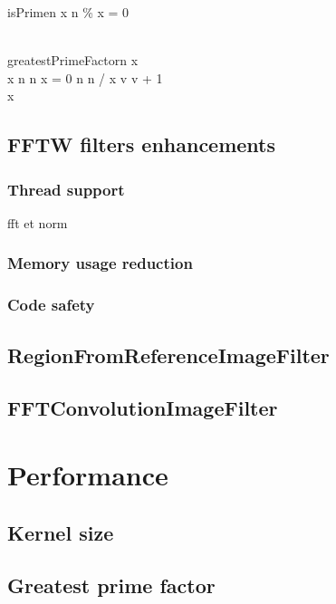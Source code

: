 \documentclass{InsightArticle}
\begin{document}
\begin{pseudocode}{isPrime}{n}
\FOREACH x \in [2, \sqrt{n}] \DO 
\BEGIN
  \IF n \% x = 0 \THEN \RETURN \FALSE \\
\END \\
\RETURN \TRUE
\end{pseudocode}

\begin{pseudocode}{greatestPrimeFactor}{n}
\label{greatestPrimeFactor}
x  \\
\WHILE x \leq n \DO
\BEGIN
  \IF n \bmod x = 0 \AND {}
  \THEN
    n \GETS n / x
  \ELSE
    v \GETS v + 1
\END \\
\RETURN x
\end{pseudocode}

\subsection{FFTW filters enhancements}
\subsubsection{Thread support}
fft et norm
\subsubsection{Memory usage reduction}
\subsubsection{Code safety}

\subsection{RegionFromReferenceImageFilter}

\subsection{FFTConvolutionImageFilter}

\section{Performance}

\subsection{Kernel size}

\subsection{Greatest prime factor}
\label{perf:gpf}
\end{document}
